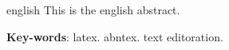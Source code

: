 \begin{resumo}[Abstract]
 \begin{otherlanguage*}{english}
  This is the english abstract.

  \vspace{\onelineskip}
 
  \noindent 
  \textbf{Key-words}: latex. abntex. text editoration.
 \end{otherlanguage*}
\end{resumo}
